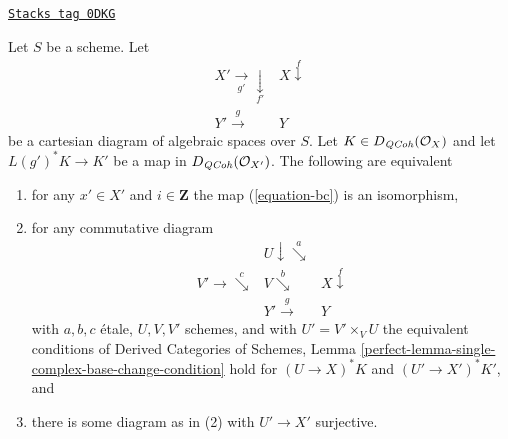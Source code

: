 \begin{lemma}
\label{spaces-perfect-lemma-single-complex-base-change-condition}
\href{https://stacks.math.columbia.edu/tag/0DKG}{\texttt{Stacks tag 0DKG}}

Let $S$ be a scheme. Let
$$
\begin{array}{cc}X' \underset{g'}{\longrightarrow}\underset{f'}{\downarrow} & X \overset{f}{\downarrow} \\ Y' \overset{g}{\longrightarrow} & Y\end{array}
$$
be a cartesian diagram of algebraic spaces over $S$.
Let $K \in D_{\mathit{QCoh}}(\mathcal{O}_X)$ and let $L(g')^*K \to K'$
be a map in $D_{\mathit{QCoh}}(\mathcal{O}_{X'})$. The following are equivalent
\begin{enumerate}
\item for any $x' \in X'$ and $i \in \mathbf{Z}$ the map (\ref{equation-bc})
is an isomorphism,
\item for any commutative diagram
$$
\begin{array}{ccc} & U \downarrow\overset{a}{\searrow} &  \\ V' \longrightarrow\overset{c}{\searrow} & V \overset{b}{\searrow} & X \overset{f}{\downarrow} \\  & Y' \overset{g}{\longrightarrow} & Y\end{array}
$$
with $a, b, c$ \'etale, $U, V, V'$ schemes, and with $U' = V' \times_V U$
the equivalent conditions of
Derived Categories of Schemes, Lemma
\ref{perfect-lemma-single-complex-base-change-condition}
hold for $(U \to X)^*K$ and $(U' \to X')^*K'$, and
\item there is some diagram as in (2) with $U' \to X'$ surjective.
\end{enumerate}
\end{lemma}

